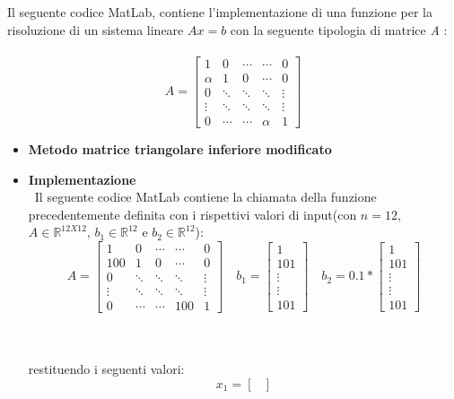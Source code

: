 Il seguente codice MatLab, contiene l'implementazione di una funzione per la risoluzione di un sistema lineare $Ax = b$ con la seguente tipologia di matrice \textit{A} :\\\
	\[
	A = \begin{bmatrix}
		1 & 0 & \cdots & \cdots & 0 \\
		\alpha & 1 & 0 & \cdots & 0 \\
		0 & \ddots & \ddots  & \ddots & \vdots \\
		\vdots & \ddots & \ddots & \ddots & \vdots \\
		0 & \cdots & \cdots & \alpha & 1
  	\end{bmatrix}
  	\]
\begin{itemize}
	\item \textbf{Metodo matrice triangolare inferiore modificato}
		
	\item \textbf{Implementazione}\\\
		Il seguente codice MatLab contiene la chiamata della funzione precedentemente definita con i rispettivi valori di input(con $n=12$, $A \in \mathbb{R}^{12X12}$, $b_1 \in \mathbb{R}^{12}$ e $b_2 \in \mathbb{R}^{12}$):
		\[
		A = \begin{bmatrix}
			1 & 0 & \cdots & \cdots & 0 \\
			100 & 1 & 0 & \cdots & 0 \\
			0 & \ddots & \ddots  & \ddots & \vdots \\
			\vdots & \ddots & \ddots & \ddots & \vdots \\
			0 & \cdots & \cdots & 100 & 1
			\end{bmatrix} \quad
		b_1 = \begin{bmatrix}
			1 \\
 			101 \\
 	 		\vdots \\
 	 		\vdots \\
	  		101 
  		\end{bmatrix} \quad
  		b_2 = 0.1*\begin{bmatrix}
			1 \\
 			101 \\
 	 		\vdots \\
	 		\vdots \\
	  		101 
  		\end{bmatrix} 
  		\]\\\
  		
  		restituendo i seguenti valori:
  		\[
  		x_1 = \begin{bmatrix}

\end{bmatrix}\]
\end{itemize}

